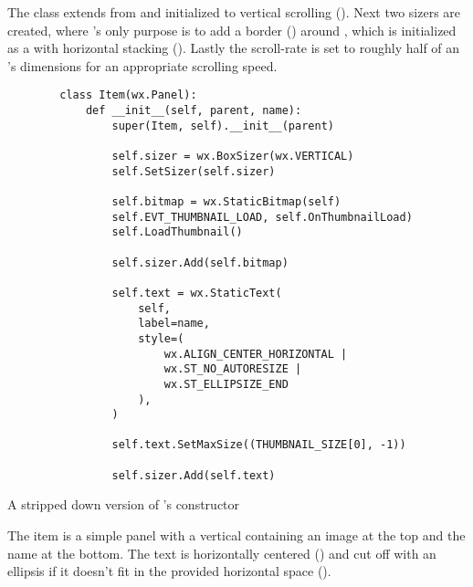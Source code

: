 
The  class extends from  and
initialized to vertical scrolling (). Next
two sizers are created, where 's only purpose is to add a
border () around
, which is initialized as a  with horizontal
stacking (). Lastly the scroll-rate is set
to roughly half of an 's dimensions for an appropriate scrolling
speed.

\begin{listing}
	\begin{verbatim}
		class Item(wx.Panel):
			def __init__(self, parent, name):
				super(Item, self).__init__(parent)

				self.sizer = wx.BoxSizer(wx.VERTICAL)
				self.SetSizer(self.sizer)

				self.bitmap = wx.StaticBitmap(self)
				self.EVT_THUMBNAIL_LOAD, self.OnThumbnailLoad)
				self.LoadThumbnail()

				self.sizer.Add(self.bitmap)

				self.text = wx.StaticText(
					self,
					label=name,
					style=(
						wx.ALIGN_CENTER_HORIZONTAL |
						wx.ST_NO_AUTORESIZE |
						wx.ST_ELLIPSIZE_END
					),
				)

				self.text.SetMaxSize((THUMBNAIL_SIZE[0], -1))

				self.sizer.Add(self.text)
	\end{verbatim}
	\caption{A stripped down version of 's constructor}
\end{listing}


The item is a simple panel with a vertical  containing an
image at the top and the name at the bottom. The text is horizontally centered
() and cut off with an ellipsis if it
doesn't fit in the provided horizontal space ().


